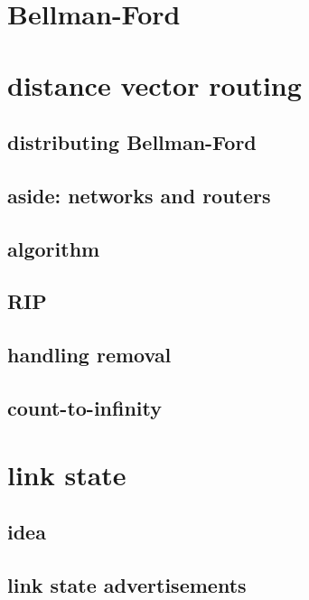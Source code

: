 \section{Bellman-Ford}


\section{distance vector routing}
\subsection{distributing Bellman-Ford}


\subsection{aside: networks and routers}
 

\subsection{algorithm}


\subsection{RIP}



\subsection{handling removal}

\subsection{count-to-infinity}

\section{link state}
\subsection{idea}

\subsection{link state advertisements}


